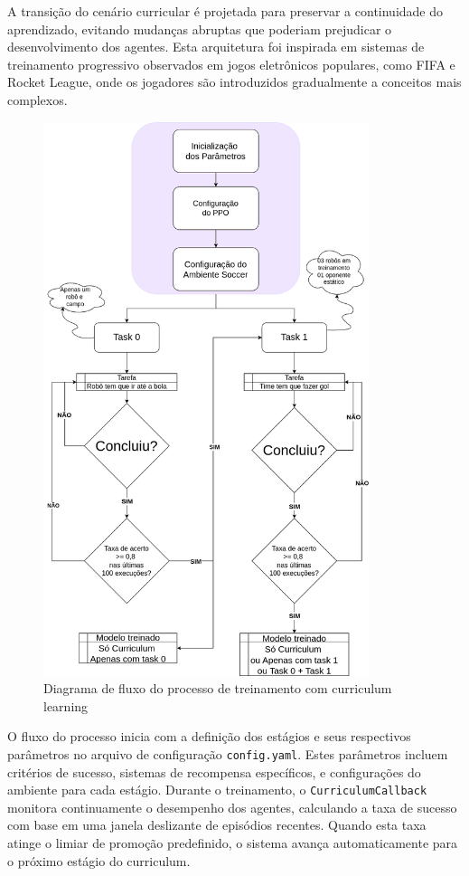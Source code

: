 A transição do cenário curricular é projetada para preservar a continuidade do aprendizado, evitando mudanças abruptas que poderiam prejudicar o desenvolvimento dos agentes. Esta arquitetura foi inspirada em sistemas de treinamento progressivo observados em jogos eletrônicos populares, como FIFA e Rocket League, onde os jogadores são introduzidos gradualmente a conceitos mais complexos.

\begin{figure}[H]
    \centering
    \includegraphics[width=0.85\textwidth]{fig/fluxograma_treino_curriculum.png}
    \caption{Diagrama de fluxo do processo de treinamento com curriculum learning}
    \label{fig:diagrama_curriculum}
\end{figure}

O fluxo do processo inicia com a definição dos estágios e seus respectivos parâmetros no arquivo de configuração \texttt{config.yaml}. Estes parâmetros incluem critérios de sucesso, sistemas de recompensa específicos, e configurações do ambiente para cada estágio. Durante o treinamento, o \texttt{CurriculumCallback} monitora continuamente o desempenho dos agentes, calculando a taxa de sucesso com base em uma janela deslizante de episódios recentes. Quando esta taxa atinge o limiar de promoção predefinido, o sistema avança automaticamente para o próximo estágio do curriculum.

